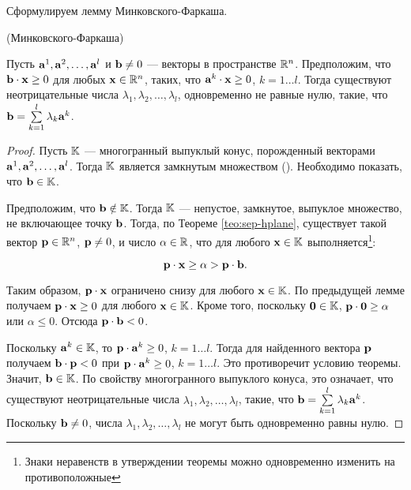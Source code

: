 Сформулируем лемму Минковского-Фаркаша.

\begin{lem}(Минковского-Фаркаша)  \label{lem:MinkFarcas}

Пусть $\mathbf{a}^1, \mathbf{a}^2, \ldots, \mathbf{a}^l$ и $\mathbf{b}\neq0$ ---
векторы в пространстве $\mathbb{R}^n$. Предположим, что $\mathbf{b} \cdot \mathbf{x}
\geq 0$ для любых $\mathbf{x} \in \mathbb{R}^n$, таких, что $\mathbf{a}^k \cdot
\mathbf{x} \geq 0$, $k=1 \ldots l$. Тогда существуют неотрицательные
числа $\lambda_1, \lambda_2, \ldots, \lambda_l$, одновременно не
равные нулю, такие, что $\mathbf{b}=\sum\limits_{k=1}^l{\lambda_k
\mathbf{a}^k}$.
\end{lem}

\begin{proof}

Пусть $\mathbb{K}$ --- многогранный выпуклый конус, порожденный
векторами $\mathbf{a}^1, \mathbf{a}^2, \ldots, \mathbf{a}^l$. Тогда $\mathbb{K}$
является замкнутым множеством (). Необходимо
показать, что $\mathbf{b} \in \mathbb{K}$.

Предположим, что $\mathbf{b} \notin \mathbb{K}$. Тогда $\mathbb{K}$ ---
непустое, замкнутое, выпуклое множество, не включающее точку
$\mathbf{b}$. Тогда, по Теореме \ref{teo:sep-hplane}, существует такой
вектор $\mathbf{p} \in \mathbb{R}^n$, $\mathbf{p} \neq 0$, и число $\alpha \in \mathbb{R}$,
что для любого $\mathbf{x} \in \mathbb{K}$ выполняется\footnote{Знаки
неравенств в утверждении теоремы можно одновременно изменить на
противоположные}:

\[\mathbf{p} \cdot \mathbf{x} \geq \alpha > \mathbf{p} \cdot \mathbf{b}.\]

Таким образом, $\mathbf{p} \cdot \mathbf{x}$ ограничено снизу для любого
$\mathbf{x} \in \mathbb{K}$. По предыдущей лемме получаем $\mathbf{p} \cdot
\mathbf{x} \geq 0$ для любого $\mathbf{x} \in \mathbb{K}$. Кроме того, поскольку
$\mathbf{0} \in \mathbb{K}$, $\mathbf{p} \cdot \mathbf{0} \geq \alpha$ или $\alpha
\leq 0$. Отсюда $\mathbf{p} \cdot \mathbf{b} < 0$.

Поскольку $\mathbf{a}^k \in \mathbb{K}$, то $\mathbf{p} \cdot \mathbf{a}^k \geq 0$,
$k=1 \ldots l$. Тогда для найденного вектора $\mathbf{p}$ получаем
$\mathbf{b} \cdot \mathbf{p} < 0$ при $\mathbf{p} \cdot \mathbf{a}^k \geq 0$, $k=1
\ldots l$. Это противоречит условию теоремы. Значит, $\mathbf{b} \in
\mathbb{K}$. По свойству многогранного выпуклого конуса, это означает,
что существуют неотрицательные числа $\lambda_1, \lambda_2, \ldots,
\lambda_l$, такие, что $\mathbf{b}=\sum\limits_{k=1}^l{\lambda_k
\mathbf{a}^k}$. Поскольку $\mathbf{b}\neq0$, числа $\lambda_1, \lambda_2,
\ldots, \lambda_l$ не могут быть одновременно равны нулю.


\end{proof}


